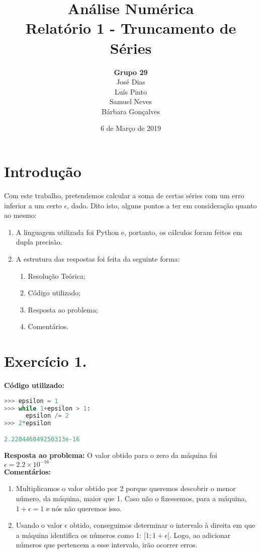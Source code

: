 \documentclass{article}
\title{\textbf{Análise Numérica\\Relatório 1 - Truncamento de Séries}}
\author{\textbf{Grupo 29}\\[4mm]José Dias\\Luís Pinto\\Samuel Neves\\Bárbara Gonçalves\\}
\date{6 de Março de 2019}
\begin{document}
\maketitle
\clearpage
\pagestyle{fancy}
\fancyhf{}
\setlength{\headheight}{30pt}
\setlength{\footskip}{15pt}
\rfoot{\thepage}
\section{Introdução}
\hspace{6mm}Com este trabalho, pretendemos calcular a soma de certas séries com um erro inferior a um certo $\epsilon$, dado. Dito isto, alguns pontos a ter em consideração quanto ao mesmo:
\begin{enumerate}
  \item{A linguagem utilizada foi Python e, portanto, os cálculos foram feitos em dupla precisão.}
  \item{A estrutura das respostas foi feita da seguinte forma:}
  \begin{enumerate}
    \item[\textbullet]{Resolução Teórica;}
    \item[\textbullet]{Código utilizado;}
    \item[\textbullet]{Resposta ao problema;}
    \item[\textbullet]{Comentários.}
  \end{enumerate}
\end{enumerate}
\section*{Exercício 1.}
\textbf{Código utilizado:}
\begin{lstlisting}[language=Python]
>>> epsilon = 1
>>> while 1+epsilon > 1:
      epsilon /= 2
>>> 2*epsilon

2.220446049250313e-16
\end{lstlisting}
\textbf{Resposta ao problema:}
O valor obtido para o zero da máquina foi $\epsilon = 2.2\times10^{-16}$\\[5mm]
\textbf{Comentários:} \begin{enumerate}
\item{Multiplicamos o valor obtido por 2 porque queremos descobrir o menor número, da máquina, maior que 1. Caso não o fizessemos, para a máquina, $1+\epsilon=1$ e nós não queremos isso.}
\item{Usando o valor $\epsilon$ obtido, conseguimos determinar o intervalo à direita em que a máquina identifica os números como 1: $[1;1+\epsilon[$. Logo, ao adicionar números que pertencem a esse intervalo, irão ocorrer erros.}
\end{enumerate}
\end{document}
